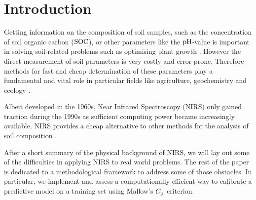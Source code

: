 \section{Introduction}
\label{sec:introduction}
	
	Getting information on the composition of soil samples, such as the concentration of soil organic carbon ($\mathrm{SOC}$), or other parameters like the $\mathrm{pH}$-value is important in solving soil-related problems such as optimising plant growth \cite[1-3]{mclaughlin:99a}.	
	However the direct measurement of soil parameters is very costly and error-prone.
	Therefore methods for fast and cheap determination of these parameters play a fundamental and vital role in particular fields like agriculture, geochemistry and ecology \cite{ludwig:01a}.

	Albeit developed in the 1960s, Near Infrared Spectroscopy (NIRS) only gained traction during the 1990s as sufficient computing power became increasingly available.
	NIRS provides a cheap alternative to other methods for the analysis of soil composition \cite[247]{agelet:10a}.

	After a short summary of the physical background of NIRS, we will lay out some of the difficulties in applying NIRS to real world problems.
	The rest of the paper is dedicated to a methodological framework to address some of those obstacles.
	In particular, we implement and assess a computationally efficient way to calibrate a predictive model on a training set using Mallow's $C_{\mathrm{p}}$ criterion.

